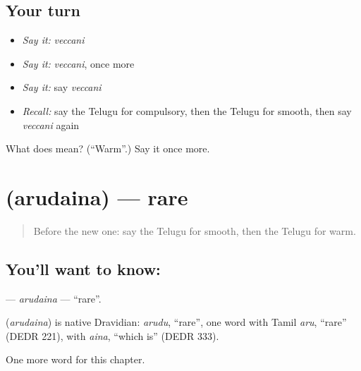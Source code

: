 \subsection*{Your turn}
\begin{itemize}
\raggedright
  \item \emph{Say it:} \emph{veccani}
  \item \emph{Say it:} \emph{veccani}, once more
  \item \emph{Say it:} say \emph{veccani}
  \item \emph{Recall:} say the Telugu for compulsory, then the Telugu for smooth, then say \emph{veccani} again
\end{itemize}

\begin{tcolorbox}[breakable,colback=teal!4,colframe=teal!35!black,title={Before you move on}]
What does  mean? (\textquotedblleft{}Warm\textquotedblright{}.) Say it once more.
\end{tcolorbox}
\section[\texorpdfstring{\te{అరుదైన} (arudaina)}{అరుదైన (arudaina)}]{ (arudaina) — rare}

\label{lesson:TE-C260-arudaina}



\begin{quote}
Before the new one: say the Telugu for smooth, then the Telugu for warm.
\end{quote}

\subsection*{You'll want to know: }
\textbf{} — \emph{arudaina} — \textquotedblleft{}rare\textquotedblright{}.

\begin{cousinweb}
\textbf{} (\emph{arudaina}) is native Dravidian: \emph{arudu}, \textquotedblleft{}rare\textquotedblright{}, one word with Tamil \emph{aru}, \textquotedblleft{}rare\textquotedblright{} (DEDR 221), with \emph{aina}, \textquotedblleft{}which is\textquotedblright{} (DEDR 333).
\end{cousinweb}

\begin{grammarlens}[title={What you've built}]
One more word for this chapter.
\end{grammarlens}

